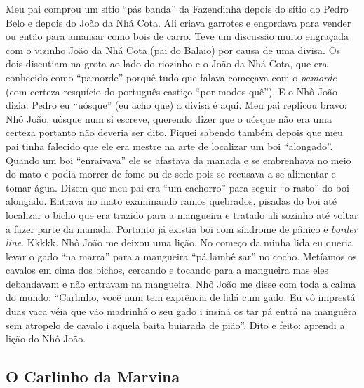 \documentclass[12pt,brazil,]{book}
\begin{document}
Meu pai comprou um sítio ``pás banda'' da Fazendinha depois do sítio do
Pedro Belo e depois do João da Nhá Cota. Ali criava garrotes e engordava
para vender ou então para amansar como bois de carro. Teve um discussão
muito engraçada com o vizinho João da Nhá Cota (pai do Balaio) por causa
de uma divisa. Os dois discutiam na grota ao lado do riozinho e o João
da Nhá Cota, que era conhecido como ``pamorde'' porquê tudo que falava
começava com o \emph{pamorde} (com certeza resquício do português
castiço ``por modos quê''). E o Nhô João dizia: Pedro eu ``uósque'' (eu
acho que) a divisa é aqui. Meu pai replicou bravo: Nhô João, uósque num
si escreve, querendo dizer que o uósque não era uma certeza portanto não
deveria ser dito. Fiquei sabendo também depois que meu pai tinha
falecido que ele era mestre na arte de localizar um boi ``alongado''.
Quando um boi ``enraivava'' ele se afastava da manada e se embrenhava no
meio do mato e podia morrer de fome ou de sede pois se recusava a se
alimentar e tomar água. Dizem que meu pai era ``um cachorro'' para
seguir ``o rasto'' do boi alongado. Entrava no mato examinando ramos
quebrados, pisadas do boi até localizar o bicho que era trazido para a
mangueira e tratado ali sozinho até voltar a fazer parte da manada.
Portanto já existia boi com síndrome de pânico e \emph{border line}.
Kkkkk. Nhô João me deixou uma lição. No começo da minha lida eu queria
levar o gado ``na marra'' para a mangueira ``pá lambê sar'' no cocho.
Metíamos os cavalos em cima dos bichos, cercando e tocando para a
mangueira mas eles debandavam e não entravam na mangueira. Nhô João me
disse com toda a calma do mundo: ``Carlinho, você num tem exprência de
lidá cum gado. Eu vô imprestá duas vaca véia que vão madrinhá o seu gado
i insiná os tar pá entrá na manguêra sem atropelo de cavalo i aquela
baita buiarada de pião''. Dito e feito: aprendi a lição do Nhô João.

\subsection{O Carlinho da Marvina}\label{o-carlinho-da-marvina}
\end{document}
